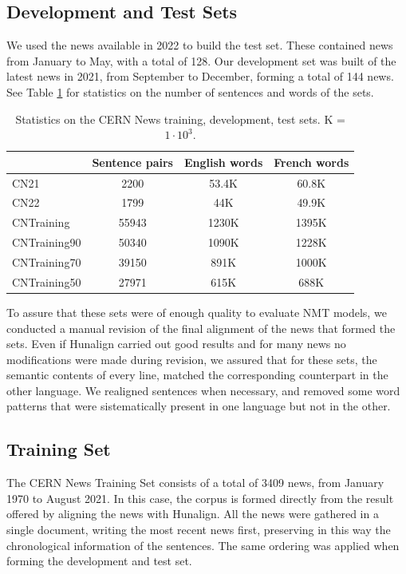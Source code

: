 \documentclass[11pt,english,listoffigures,listoftables]{tfgetsinf}
\begin{document}
\subsection{Development and Test Sets}
We used the news available in 2022 to build the test set. These contained news from January to May, with a total of 128. Our development set was built of the latest news in 2021, from September to December, forming a total of 144 news. See Table \ref{table:cnstats} for statistics on the number of sentences and words of the sets.

\begin{table}
\caption{Statistics on the CERN News training, development, test sets. K = $1\cdot10^3.$}
\centering
\begin{tabular}{l|c|c|c}
& Sentence pairs & English words & French words \\
\hline
    CN21 & 2200 & 53.4K & 60.8K \\
    CN22 & 1799 & 44K & 49.9K \\
\hline
    CNTraining & 55943 & 1230K & 1395K \\
    CNTraining90 & 50340 & 1090K & 1228K \\
    CNTraining70 & 39150 & 891K & 1000K \\
    CNTraining50 & 27971 & 615K & 688K \\
\hline

\end{tabular}
\label{table:cnstats}
\end{table}

To assure that these sets were of enough quality to evaluate NMT models, we conducted a manual revision of the final alignment of the news that formed the sets. Even if Hunalign carried out good results and for many news no modifications were made during revision, we assured that for these sets, the semantic contents of every line, matched the corresponding counterpart in the other language. We realigned sentences when necessary, and removed some word patterns that were sistematically present in one language but not in the other.  

\subsection{Training Set}\label{CNTrain}
The CERN News Training Set consists of a total of 3409 news, from January 1970 to August 2021. In this case, the corpus is formed directly from the result offered by aligning the news with Hunalign. All the news were gathered in a single document, writing the most recent news first, preserving in this way the chronological information of the sentences. The same ordering was applied when forming the development and test set. 
\end{document}
